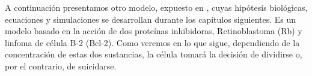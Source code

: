 A continuación presentamos otro modelo, expuesto en \cite{JTB}, cuyas hipótesis biológicas, ecuaciones y simulaciones se desarrollan durante los capítulos siguientes. Es un modelo basado en la acción de dos proteínas inhibidoras, Retinoblastoma (Rb) y linfoma de célula B-2 (Bcl-2). Como veremos en lo que sigue, dependiendo de la concentración de estas dos sustancias, la célula tomará la decisión de dividirse o, por el contrario, de suicidarse.  


